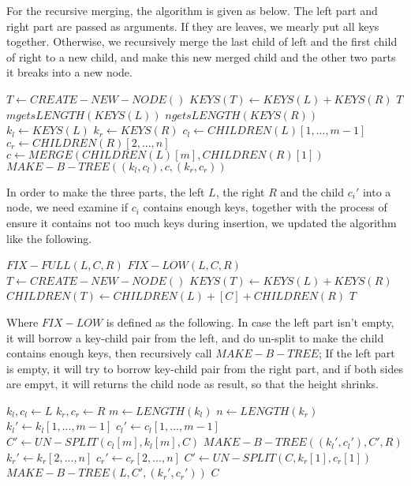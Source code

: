 \documentclass{article}
\begin{document}
For the recursive merging, the algorithm is given as below.
The left part and right part are passed as arguments. If
they are leaves, we mearly put all keys together. Otherwise,
we recursively merge the last child of left and the first child
of right to a new child, and make this new merged child and
the other two parts it breaks into a new node.

\begin{algorithmic}[1]
    \State $T \gets CREATE-NEW-NODE()$
    \State $KEYS(T) \gets KEYS(L)+KEYS(R)$
    \State \Return $T$
  \Else
    \State $m gets LENGTH(KEYS(L))$
    \State $n gets LENGTH(KEYS(R))$
    \State $k_l \gets KEYS(L)$
    \State $k_r \gets KEYS(R)$
    \State $c_l \gets CHILDREN(L)[1, ..., m-1]$
    \State $c_r \gets CHILDREN(R)[2, ..., n]$
    \State $c \gets MERGE(CHILDREN(L)[m], CHILDREN(R)[1])$
    \State \Return $MAKE-B-TREE((k_l, c_l), c, (k_r, c_r))$
  \EndIf
\EndFunction
\end{algorithmic}

In order to make the three parts, the left $L$, the right $R$ and 
the child $c_i'$ into a node, we need examine if $c_i$ contains 
enough keys, together with the process of ensure it contains not too
much keys during insertion, we updated the algorithm like the following.

\begin{algorithmic}[1]
    \State \Return $FIX-FULL(L, C, R)$
    \State \Return $FIX-LOW(L, C, R)$
  \Else
    \State $T \leftarrow CREATE-NEW-NODE()$
    \State $KEYS(T) \leftarrow KEYS(L) + KEYS(R)$
    \State $CHILDREN(T) \leftarrow CHILDREN(L)+[C]+CHILDREN(R)$
    \State \Return $T$    
  \EndIf
\EndFunction
\end{algorithmic}

Where $FIX-LOW$ is defined as the following. In case the left part
isn't empty, it will borrow a key-child pair from the left, and
do un-split to make the child contains enough keys, then recursively
call $MAKE-B-TREE$; If the left part is empty, it will try to borrow
key-child pair from the right part, and if both sides are empyt, it
will returns the child node as result, so that the height shrinks.

\begin{algorithmic}[1]
  \State $k_l, c_l \gets L$
  \State $k_r, c_r \gets R$
  \State $m \gets LENGTH(k_l)$
  \State $n \gets LENGTH(k_r)$
    \State $k_l' \gets k_l[1, ..., m-1]$
    \State $c_l' \gets c_l[1, ..., m-1]$
    \State $C' \gets UN-SPLIT(c_l[m], k_l[m], C)$
    \State \Return $MAKE-B-TREE((k_l', c_l'), C', R)$
    \State $k_r' \gets k_r[2, ..., n]$
    \State $c_r' \gets c_r[2, ..., n]$
    \State $C' \gets UN-SPLIT(C, k_r[1], c_r[1])$
    \State \Return $MAKE-B-TREE(L, C', (k_r', c_r'))$
  \Else
    \State \Return $C$
  \EndIf
\EndFunction
\end{algorithmic}
\end{document}
